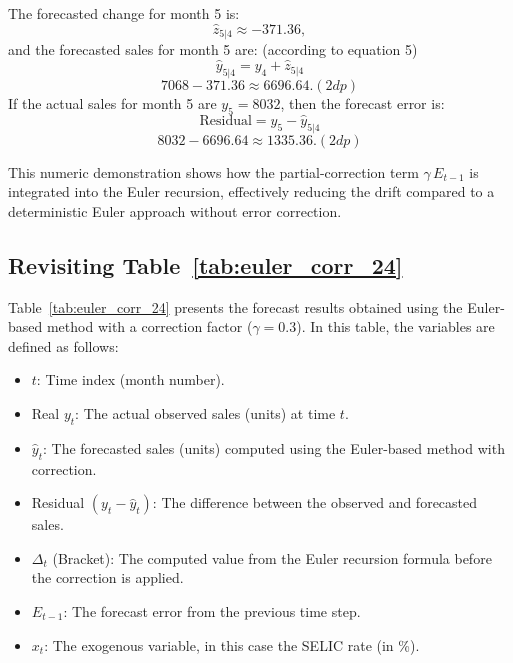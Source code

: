 \documentclass{article}
\begin{document}
The forecasted change for month 5 is:
\[
\hat{z}_{5|4} \approx -371.36,
\]
and the forecasted sales for month 5 are: (according to equation 5)
\[
\hat{y}_{5|4} = y_4 + \hat{z}_{5|4} \] \[7068 - 371.36 \approx 6696.64. (2dp)
\]
If the actual sales for month 5 are \(y_5 = 8032\), then the forecast error is:
\[
\text{Residual} = y_5 - \hat{y}_{5|4}\]  \[8032 - 6696.64 \approx 1335.36. (2dp)
\]

This numeric demonstration shows how the partial-correction term \(\gamma\,E_{t-1}\) is integrated into the Euler recursion, effectively reducing the drift compared to a deterministic Euler approach without error correction.


\subsection{Revisiting Table~\ref{tab:euler_corr_24}}

Table~\ref{tab:euler_corr_24} presents the forecast results obtained using the Euler-based method with a correction factor (\(\gamma=0.3\)). In this table, the variables are defined as follows:
\begin{itemize}
    \item \(t\): Time index (month number).
    \item Real \(y_t\): The actual observed sales (units) at time \(t\).
    \item \(\hat{y}_t\): The forecasted sales (units) computed using the Euler-based method with correction.
    \item Residual \((y_t-\hat{y}_t)\): The difference between the observed and forecasted sales.
    \item \(\Delta_t\) (Bracket): The computed value from the Euler recursion formula before the correction is applied.
    \item \(E_{t-1}\): The forecast error from the previous time step.
    \item \(x_t\): The exogenous variable, in this case the SELIC rate (in \%).
\end{itemize}
\end{document}
